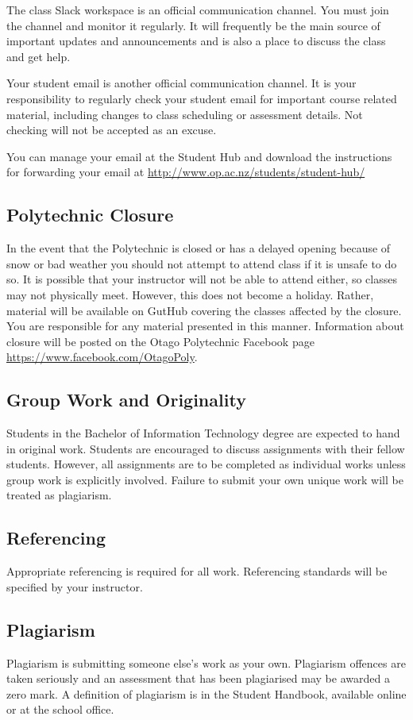 \documentclass{article}
\begin{document}
The class Slack workspace is an official communication channel. You must join the channel and monitor it regularly. It will frequently be the main source of important updates and announcements and is also a place to discuss the class and get help.

Your student email is another official communication channel. It is your responsibility to regularly check your student email for important course related material, including changes to class scheduling or assessment details. Not checking will not be accepted as an excuse.

You can manage your email at the Student Hub and download the instructions for forwarding your email at \url{http://www.op.ac.nz/students/student-hub/}

\subsection*{Polytechnic Closure}
In the event that the Polytechnic is closed or has a delayed opening because of snow or bad weather you should not attempt to attend class if it is unsafe to do so. It is possible that your instructor will not be able to attend either, so classes may not physically meet. However, this does not become a holiday. Rather, material will be available on GutHub covering the classes affected by the closure. You are responsible for any material presented in this manner. Information about closure will be posted on the Otago Polytechnic Facebook page \url{https://www.facebook.com/OtagoPoly}.

\subsection*{Group Work and Originality}
Students in the Bachelor of Information Technology degree are expected to hand in original work.  Students are encouraged to discuss
assignments with their fellow students.  However, all assignments are to be completed as individual works unless group work is explicitly involved.
Failure to submit your own unique work will be treated as plagiarism.

\subsection*{Referencing}
Appropriate referencing is required for all work.  Referencing standards will be specified by your instructor.

\subsection*{Plagiarism}
Plagiarism is submitting someone else's work as your own.  Plagiarism offences are taken seriously and an
assessment that has been plagiarised may be awarded a zero mark.  A definition of plagiarism is in the Student Handbook,
available online or at the school office.
\end{document}
